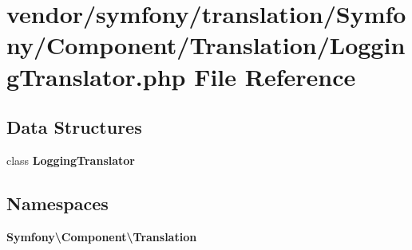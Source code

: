 \section{vendor/symfony/translation/\+Symfony/\+Component/\+Translation/\+Logging\+Translator.php File Reference}
\label{_logging_translator_8php}
\subsection*{Data Structures}
\begin{DoxyCompactItemize}
\item 
class {\bf Logging\+Translator}
\end{DoxyCompactItemize}
\subsection*{Namespaces}
\begin{DoxyCompactItemize}
\item 
 {\bf Symfony\textbackslash{}\+Component\textbackslash{}\+Translation}
\end{DoxyCompactItemize}
